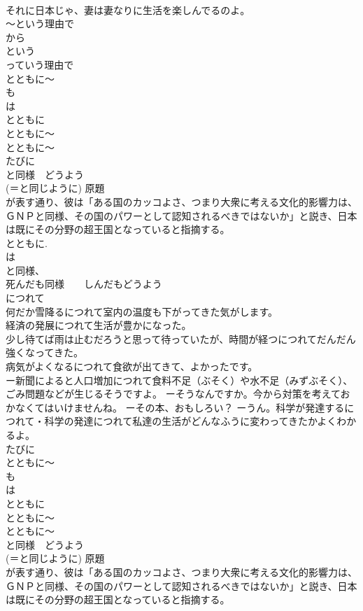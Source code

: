 \documentclass[8pt]{extreport}
\begin{document}
\begin{CJK}{UTF8}{min}
\\	それに日本じゃ、妻は妻なりに生活を楽しんでるのよ。
\\	～という理由で	
\\	から 
\\	という 
\\	っていう理由で
\\	とともに～	
\\	も 
\\	は
\\	とともに
\\	とともに～ 
\\	とともに～ 
\\	たびに
\\	と同様　どうよう 
\\	(＝と同じように) 原題
\\	が表す通り、彼は「ある国のカッコよさ、つまり大衆に考える文化的影響力は、ＧＮＰと同様、その国のパワーとして認知されるべきではないか」と説き、日本は既にその分野の超王国となっていると指摘する。 
\\	とともに. 
\\	は
\\	と同様、
\\	死んだも同様　　しんだもどうよう 
\\	につれて 
\\	何だか雪降るにつれて室内の温度も下がってきた気がします。 
\\	経済の発展につれて生活が豊かになった。 
\\	少し待てば雨は止むだろうと思って待っていたが、時間が経つにつれてだんだん強くなってきた。 
\\	病気がよくなるにつれて食欲が出てきて、よかったです。 
\\	ー新聞によると人口増加につれて食料不足（ぶそく）や水不足（みずぶそく）、ごみ問題などが生じるそうですよ。 ーそうなんですか。今から対策を考えておかなくてはいけませんね。 ーその本、おもしろい？ ーうん。科学が発達するにつれて・科学の発達につれて私達の生活がどんなふうに変わってきたかよくわかるよ。
\\	たびに
\\	とともに～ 
\\	も 
\\	は
\\	とともに
\\	とともに～ 
\\	とともに～ 
\\	と同様　どうよう 
\\	(＝と同じように) 原題
\\	が表す通り、彼は「ある国のカッコよさ、つまり大衆に考える文化的影響力は、ＧＮＰと同様、その国のパワーとして認知されるべきではないか」と説き、日本は既にその分野の超王国となっていると指摘する。 

\end{CJK}
\end{document}
